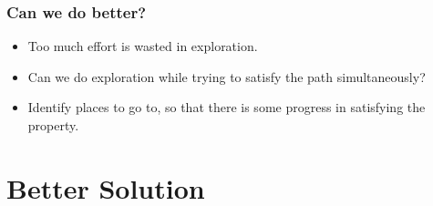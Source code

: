 \documentclass{if-beamer}
\begin{document}



\begin{frame}
	\frametitle{Can we do better?}
	\begin{itemize}
		\item Too much effort is wasted in exploration. \pause
		\item Can we do exploration while trying to satisfy the path simultaneously? \pause
		\item Identify places to go to, so that there is some progress in satisfying the property.
	\end{itemize}
\end{frame}


\section{Better Solution}
\end{document}
